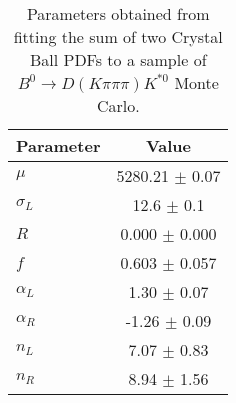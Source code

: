 \begin{table}
  \centering
  \begin{tabular}{lc}
      \toprule
      Parameter & Value \\
      \midrule
      $\mu$ & 5280.21 $\pm$ 0.07 \\
      $\sigma_L$ & 12.6 $\pm$ 0.1 \\
      $R$ & 0.000 $\pm$ 0.000 \\
      $f$ & 0.603 $\pm$ 0.057 \\
      $\alpha_L$ & 1.30 $\pm$ 0.07 \\
      $\alpha_R$ & -1.26 $\pm$ 0.09 \\
      $n_L$ & 7.07 $\pm$ 0.83 \\
      $n_R$ & 8.94 $\pm$ 1.56 \\
  \bottomrule
  \end{tabular}
  \caption{Parameters obtained from fitting the sum of two Crystal Ball PDFs to a sample of $B^0 \to D(K\pi\pi\pi)K^{*0}$ Monte Carlo.}
\label{tab:signal_Kpipipi_MC_params}
\end{table}
